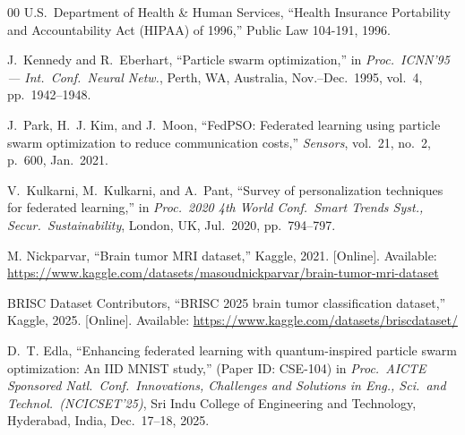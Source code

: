 \documentclass[conference]{IEEEtran}
\begin{document}
\begin{thebibliography}{00}
U.S.\ Department of Health \& Human Services,
``Health Insurance Portability and Accountability Act (HIPAA) of 1996,''
Public Law 104-191, 1996.

J.~Kennedy and R.~Eberhart,
``Particle swarm optimization,''
in \textit{Proc.\ ICNN'95 --- Int.\ Conf.\ Neural Netw.}, Perth, WA, Australia,
Nov.--Dec.\ 1995, vol.~4, pp.~1942--1948.

J.~Park, H.~J. Kim, and J.~Moon,
``FedPSO: Federated learning using particle swarm optimization to
reduce communication costs,''
\textit{Sensors}, vol.~21, no.~2, p.~600, Jan.\ 2021.

V.~Kulkarni, M.~Kulkarni, and A.~Pant,
``Survey of personalization techniques for federated learning,''
in \textit{Proc.\ 2020 4th World Conf.\ Smart Trends Syst., Secur.\ Sustainability},
London, UK, Jul.\ 2020, pp.~794--797.

M. Nickparvar,
``Brain tumor MRI dataset,''
Kaggle, 2021. [Online]. Available:
\url{https://www.kaggle.com/datasets/masoudnickparvar/brain-tumor-mri-dataset}

BRISC Dataset Contributors,
``BRISC 2025 brain tumor classification dataset,''
Kaggle, 2025. [Online]. Available:
\url{https://www.kaggle.com/datasets/briscdataset/}

D.~T. Edla,
``Enhancing federated learning with quantum-inspired particle swarm
optimization: An {IID} {MNIST} study,'' (Paper ID: CSE-104)
in \textit{Proc.\ AICTE Sponsored Natl.\ Conf.\ Innovations, Challenges
and Solutions in Eng., Sci.\ and Technol.\ (NCICSET'25)},
Sri Indu College of Engineering and Technology, Hyderabad, India,
Dec.\ 17--18, 2025.

\end{thebibliography}
\end{document}
